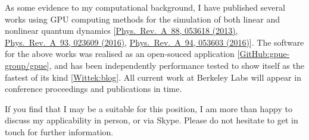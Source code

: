 \documentclass[11pt,a4paper,unicode]{moderncv}
\begin{document}
{    %

    As some evidence to my computational background, I have published several works using GPU computing methods for the simulation of both linear and nonlinear quantum dynamics [\href{http://journals.aps.org/pra/abstract/10.1103/PhysRevA.88.053618}{Phys.~Rev.~A~88, 053618 (2013)}, \href{https://journals.aps.org/pra/abstract/10.1103/PhysRevA.93.023609}{Phys.~Rev.~A~93, 023609 (2016)}, \href{https://journals.aps.org/pra/abstract/10.1103/PhysRevA.94.053603}{Phys.~Rev.~A~94, 053603 (2016)}]. The software for the above works was realised as an open-souced application [\href{https://github.com/gpue-group/gpue}{GitHub:gpue-group/gpue}], and has been independently performance tested to show itself as the fastest of its kind [\href{http://peterwittek.com/gpe-comparison.html}{Wittek:blog}]. All current work at Berkeley Labs will appear in conference proceedings and publications in time.

    If you find that I may be a suitable for this position, I am more than happy to discuss my applicability in person, or via Skype. Please do not hesitate to get in touch for further information.
    \vspace{-0.15cm}
}

\makeletterclosing
\end{document}
